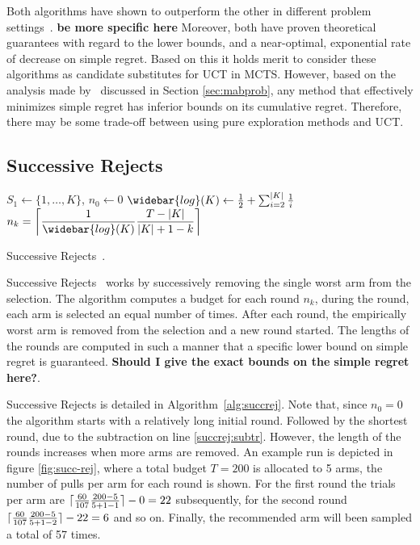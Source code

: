 \documentclass{kecsmstr}
\DeclarePairedDelimiter{\ceil}{\lceil}{\rceil}
\newcommand{\TODO}[1]{\textbf{\color{red}#1}}
\begin{document}
Both algorithms have shown to outperform the other in different problem settings~. \TODO{be more specific here} Moreover, both have proven theoretical guarantees with regard to the lower bounds, and a near-optimal, exponential rate of decrease on simple regret. Based on this it holds merit to consider these algorithms as candidate substitutes for UCT in MCTS. However, based on the analysis made by~ discussed in Section \ref{sec:mabprob}, any method that effectively minimizes simple regret has inferior bounds on its cumulative regret. Therefore, there may be some trade-off between using pure exploration methods and UCT.

\subsection{Successive Rejects}
\IncMargin{1em}
\begin{algorithm2e}[ht]
	\Indm
	\vspace{0.2cm}
	\Indp
	$S_1 \gets \{1,\dots,K\}$, $n_0 \gets 0$										\; 
	$\widebar{log}(K) \gets \frac{1}{2} + \sum_{i=2}^{|K|} \frac{1}{i}$				\;
	\BlankLine
	 {
		$n_k = \displaystyle\ceil[\bigg]{\frac{1}{\widebar{log}(K)} \frac{T-|K|}{|K|+1-k}}$				\;
	}
	\BlankLine
	\BlankLine
  \caption[Successive Rejects]{Successive Rejects~\protect{}. \label{alg:succrej}}
\end{algorithm2e}
\DecMargin{1em}

Successive Rejects~ works by successively removing the single worst arm from the selection. The algorithm computes a budget for each round $n_k$, during the round, each arm is selected an equal number of times. After each round, the empirically worst arm is removed from the selection and a new round started. The lengths of the rounds are computed in such a manner that a specific lower bound on simple regret is guaranteed. \TODO{Should I give the exact bounds on the simple regret here?}. 

Successive Rejects is detailed in Algorithm~\ref{alg:succrej}. Note that, since $n_0 = 0$ the algorithm starts with a relatively long initial round. Followed by the shortest round, due to the subtraction on line \ref{succrej:subtr}. However, the length of the rounds increases when more arms are removed. An example run is depicted in figure \ref{fig:succ-rej}, where a total budget $T = 200$ is allocated to 5 arms, the number of pulls per arm for each round is shown. For the first round the trials per arm are $\ceil{\frac{60}{107} \frac{200-5}{5+1-1}} - 0 = 22$ subsequently, for the second round $\ceil{\frac{60}{107} \frac{200-5}{5+1-2}} - 22 = 6$ and so on. Finally, the recommended arm will been sampled a total of 57 times.
\end{document}
